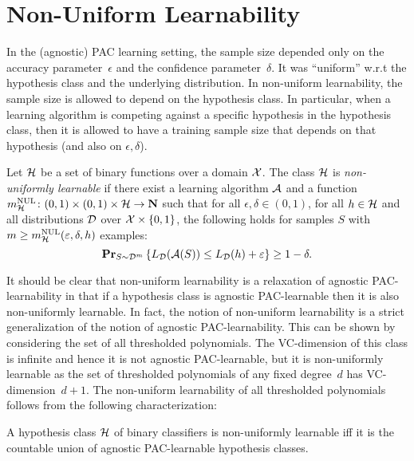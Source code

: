 \chapter{Non-Uniform Learnability}

In the (agnostic) PAC learning setting, the sample size depended only on the
accuracy parameter~$\epsilon$ and the confidence parameter~$\delta$. It was ``uniform''
w.r.t the hypothesis class and the underlying distribution. In non-uniform
learnability, the sample size is allowed to depend on the hypothesis class.
In particular, when a learning algorithm is competing against a specific hypothesis
in the hypothesis class, then it is allowed to have a training sample size that depends
on that hypothesis (and also on $\epsilon, \delta$).

\begin{definition}
Let $\mathcal{H}$ be a set of binary functions over a domain $\mathcal{X}$.  The class
$\mathcal{H}$ is \emph{non-uniformly learnable} if there exist a learning
algorithm $\mathcal{A}$ and a function $m_{\mathcal{H}}^{\text{NUL}} \colon (0, 1) \times (0, 1)
\times \mathcal{H} \rightarrow \mathbf{N}$ such that for all $\epsilon, \delta \in (0,
1)$, for all $h \in \mathcal{H}$ and all distributions $\mathcal{D}$ over
$\mathcal{X} \times \{0, 1\}$, the following holds for samples $S$
with $m \geq m_{\mathcal{H}}^{\text{NUL}}(\varepsilon, \delta, h)$ examples:
\[
    \mathbf{Pr}_{S \sim \mathcal{D}^m} \left \{ L_{\mathcal{D}}(\mathcal{A} (S)) \leq L_{\mathcal{D}} (h) + \varepsilon \right \}
        \geq 1 - \delta.
\]
\end{definition}

It should be clear that non-uniform learnability is a relaxation of agnostic
PAC-learnability in that if a hypothesis class is agnostic PAC-learnable then it
is also non-uniformly learnable. In fact, the notion of non-uniform learnability
is a strict generalization of the notion of agnostic PAC-learnability. This can be
shown by considering the set of all thresholded polynomials. The VC-dimension of
this class is infinite and hence it is not agnostic PAC-learnable, but
it is non-uniformly learnable as the set of thresholded polynomials of any
fixed degree~$d$ has VC-dimension~$d + 1$. The non-uniform learnability of all
thresholded polynomials follows from the following characterization:

\begin{theorem} \label{thm:non_uniform}
A hypothesis class $\mathcal{H}$ of binary classifiers is non-uniformly learnable iff it
is the countable union of agnostic PAC-learnable hypothesis classes.
\end{theorem}

